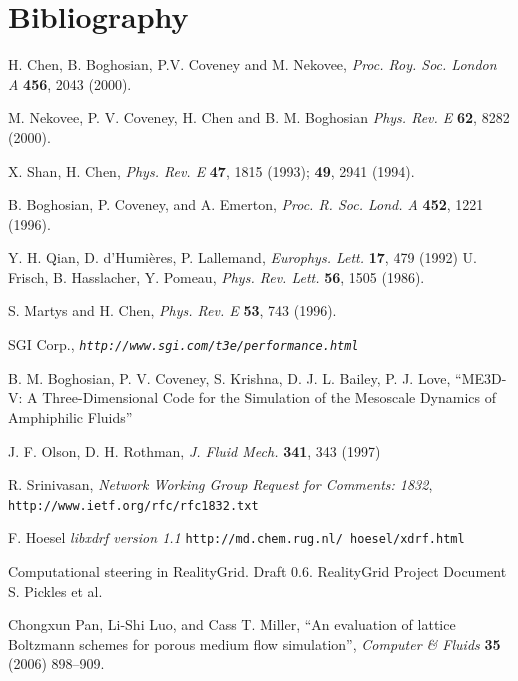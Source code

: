 \documentclass[a4paper]{article}
\begin{document}
\section{Bibliography}
\begin{thebibliography}{32}
 H. Chen, B. Boghosian, P.V. Coveney and M. Nekovee,
{\it Proc. Roy. Soc. London A} {\bf 456}, 2043 (2000).

	M. Nekovee, P. V. Coveney, H. Chen and  B. M. Boghosian
	{\it Phys. Rev. E} {\bf 62}, 8282 (2000).

 X. Shan, H. Chen,
	{\it Phys. Rev. E} {\bf 47}, 1815 (1993); {\bf 49}, 2941
        (1994).

	B. Boghosian, P. Coveney, and A. Emerton, 
	{\it Proc. R. Soc. Lond. A} {\bf 452}, 1221 (1996).

	Y. H. Qian, D. d'Humi\`{e}res, P. Lallemand,
	{\it Europhys. Lett.} {\bf 17}, 479 (1992)
U. Frisch, B. Hasslacher, Y. Pomeau, {\em Phys. Rev. Lett.} {\bf 56}, 
1505 (1986).

        S. Martys and H. Chen,
        {\it Phys. Rev. E} {\bf 53}, 743 (1996).
        
	SGI Corp.,
	{\it {\tt http://www.sgi.com/t3e/performance.html} }

	B. M. Boghosian, P. V. Coveney, S. Krishna, D. J. L. Bailey,
	P. J. Love,
	``ME3D-V: A Three-Dimensional Code for the Simulation of
		the Mesoscale Dynamics of Amphiphilic Fluids''

	J. F. Olson, D. H. Rothman,
	{\it J. Fluid Mech.} {\bf 341}, 343 (1997)

	R. Srinivasan,
	{\it Network Working Group Request for Comments: 1832},
	{\tt http://www.ietf.org/rfc/rfc1832.txt }

        F. Hoesel
        {\it libxdrf version 1.1}
        {\tt http://md.chem.rug.nl/~hoesel/xdrf.html } 

 Computational steering in RealityGrid. Draft 0.6. RealityGrid Project
 Document S. Pickles et al.

 Chongxun Pan, Li-Shi Luo, and Cass T. Miller, ``An evaluation of
lattice Boltzmann schemes for porous medium flow simulation'', \textsl{Computer
\& Fluids} \textbf{35} (2006) 898--909. 


\end{thebibliography}
\end{document}
